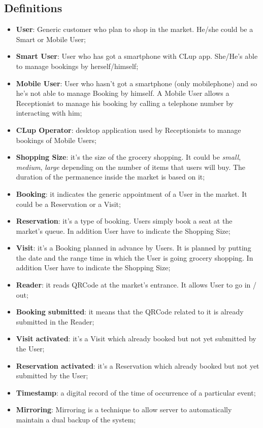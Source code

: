 \subsection{Definitions}
\begin{itemize}
\item \textbf{User}: Generic customer who plan to shop in the market. He/she could be a Smart or Mobile User;
\item \textbf{Smart User}: User who has got a smartphone with CLup app. She/He's able to manage bookings by herself/himself;
\item \textbf{Mobile User}: User who hasn't got a smartphone (only mobilephone) and so he's not able to manage Booking by himself. A Mobile User allows a Receptionist to manage his booking by calling a telephone number by interacting with him;
\item \textbf{CLup Operator}: desktop application used by Receptionists to manage bookings of Mobile Users;
\item \textbf{Shopping Size}: it's the size of the grocery shopping. It could be \textit{small}, \textit{medium}, \textit{large} depending on the number of items that users will buy. The duration of the permanence inside the market is based on it; 
\item \textbf{Booking}: it indicates the generic appointment of a User in the market. It could be a Reservation or a Visit;
\item \textbf{Reservation}: it's a type of booking. Users simply book a seat at the market's queue. In addition User have to indicate the Shopping Size; 
\item \textbf{Visit}: it's a Booking planned in advance by Users. It is planned by putting the date and the range time in which the User is going grocery shopping. In addition User have to indicate the Shopping Size; 
\item \textbf{Reader}: it reads QRCode at the market's entrance. It allows User to go in / out;
\item \textbf{Booking submitted}: it means that the QRCode related to it is already submitted in the Reader;
\item \textbf{Visit activated}: it's a Visit which already booked but not yet submitted by the User;
\item \textbf{Reservation activated}: it's a Reservation which already booked but not yet submitted by the User;
\item \textbf{Timestamp}: a digital record of the time of occurrence of a particular event;
\item\textbf{Mirroring}: Mirroring is a technique to allow server to automatically maintain a dual backup of the system;
\end{itemize}

